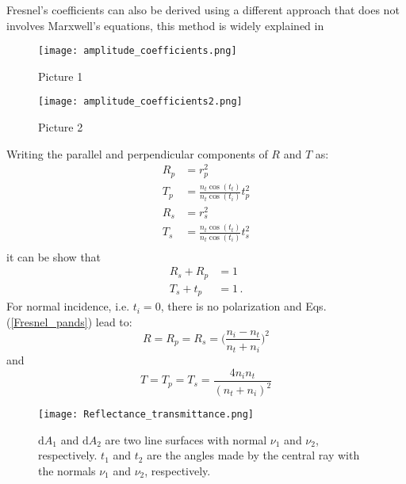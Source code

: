 Fresnel's coefficients can also be derived using a different approach that does not involves Marxwell's equations, this method is widely explained in \cite{feynman2011feynman}
\begin{figure}[h]
  \begin{minipage}[h]{0.4\textwidth}
    \texttt{[image: amplitude\_coefficients.png]}
    \caption{Picture 1}
    \label{fig:1}
  \end{minipage}
  \begin{minipage}[h]{0.4\textwidth}
    \texttt{[image: amplitude\_coefficients2.png]}
    \caption{Picture 2}
   \label{fig:2}
 \end{minipage}
\end{figure}

Writing the parallel and perpendicular components of $R$ and $T$ as:
\begin{equation}\label{Fresnel_pands}
\begin{split}
R_p &= r_p^2\\
T_p &= \frac{n_t \cos(t_t)}{n_t \cos(t_i)}t_p^2\\
R_s &= r_s^2\\
T_s &= \frac{n_t \cos(t_t)}{n_t \cos(t_i)}t_s^2\\
\end{split}
\end{equation}
it can be show that
\begin{equation}
\begin{split}
R_s+R_p &= 1\\
T_s+t_p &=1\,.
\end{split}
\end{equation}
For normal incidence, i.e. $t_i = 0$, there is no polarization and Eqs. (\ref{Fresnel_pands}) lead to:
\begin{equation}
R = R_p = R_s = \Bigg(\frac{n_i-n_t}{n_t+n_i}\Bigg)^2
\end{equation}
and 
\begin{equation}
T = T_p = T_s = \frac{4n_i n_t}{(n_t+n_i)^2}
\end{equation}
\begin{figure}[h]
 \label{fig:Reflectance_transmittance}
     \begin{center}
     \texttt{[image: Reflectance\_transmittance.png]}
     \end{center}
     \caption{\footnotesize{$\textrm{d}A_1$ and $\textrm{d}A_2$ are two line surfaces with normal $\nu_1$ and $\nu_2$, respectively. $t_1$ and $t_2$ are the angles made by the central ray with the normals $\nu_1$ and $\nu_2$, respectively.}}
\label{fig:amplitude_coefficients}
 \end{figure}
